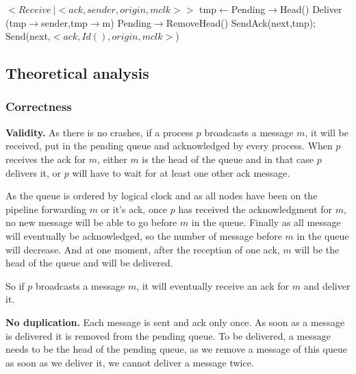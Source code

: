 \documentclass[a4paper]{article}
\begin{document}
\begin{algorithm}[H]
    \centering
    \begin{algorithmic}[5]
        \Event $<Receive\  | <ack,sender,origin, mclk>>$
        \State tmp$\gets$Pending$\rightarrow$Head()
        \State Deliver (tmp$\rightarrow$sender,tmp$\rightarrow$m)
        \State Pending$\rightarrow$RemoveHead()
        \EndWhile
        \State SendAck(next,tmp);
        \EndIf
        \Else
        \State Send(next,$<ack,Id(),origin,mclk>$)
        \EndIf
        \EndIf
        \EndEvent
    \end{algorithmic}
\end{algorithm}


\subsection{Theoretical analysis}
\subsubsection{Correctness}
\label{sec:pipelineack-proof}
\noindent\textbf{Validity.} As there is no crashes, if a process $p$
broadcasts a message $m$, it will be received, put in the pending queue and
acknowledged by every process. When $p$ receives the ack for $m$, either $m$
is the head of the queue and in that case $p$ delivers it, or $p$ will have
to wait for at least one other ack message.

As the queue is ordered by logical clock and as all nodes have been on the
pipeline forwarding $m$ or it's ack, once $p$ has received the acknowledgment
for $m$, no new message will be able to go before $m$ in the queue. Finally as
all message will eventually be acknowledged, so the number of message before
$m$ in the queue will decrease. And at one moment, after the reception of one
ack, $m$ will be the head of the queue and will be delivered.

So if $p$ broadcasts a message $m$, it will eventually receive an ack for $m$
and deliver it.

\bigskip
\noindent\textbf{No duplication.} Each message is sent and ack only once. As
soon as a message is delivered it is removed from the pending queue. To be
delivered, a message needs to be the head of the pending queue, as we remove a
message of this queue as soon as we deliver it, we cannot deliver a message
twice.
\end{document}
